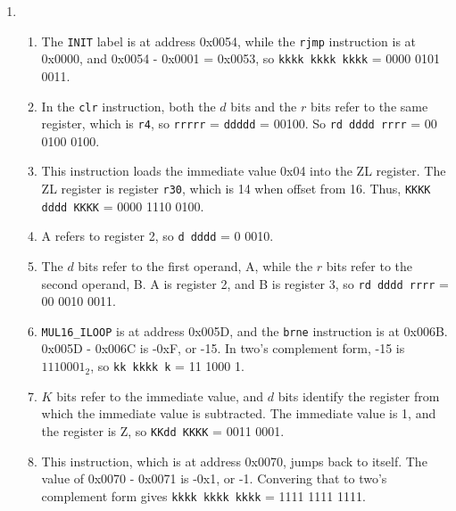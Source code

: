 \documentclass[11pt]{article}
\begin{document}
\begin{enumerate}[leftmargin=0.2in]
\item
  \begin{enumerate}
    \item The \texttt{INIT} label is at address 0x0054, while the \texttt{rjmp} instruction is at 0x0000, and 0x0054 - 0x0001 = 0x0053, so \texttt{kkkk kkkk kkkk} = 0000 0101 0011.
    \item In the \texttt{clr} instruction, both the $d$ bits and the $r$ bits refer to the same register, which is \texttt{r4}, so \texttt{rrrrr} = \texttt{ddddd} = 00100. So \texttt{rd dddd rrrr} = 00 0100 0100.
    \item This instruction loads the immediate value 0x04 into the ZL register. The ZL register is register \texttt{r30}, which is 14 when offset from 16. Thus, \texttt{KKKK dddd KKKK} = 0000 1110 0100.
    \item A refers to register 2, so \texttt{d dddd} = 0 0010.
    \item The $d$ bits refer to the first operand, A, while the $r$ bits refer to the second operand, B. A is register 2, and B is register 3, so \texttt{rd dddd rrrr} = 00 0010 0011.
    \item \texttt{MUL16\_ILOOP} is at address 0x005D, and the \texttt{brne} instruction is at 0x006B. 0x005D - 0x006C is -0xF, or -15. In two's complement form, -15 is $1110001_2$, so \texttt{kk kkkk k} = 11 1000 1.
    \item $K$ bits refer to the immediate value, and $d$ bits identify the register from which the immediate value is subtracted. The immediate value is 1, and the register is Z, so \texttt{KKdd KKKK} = 0011 0001.
    \item This instruction, which is at address 0x0070, jumps back to itself. The value of 0x0070 - 0x0071 is -0x1, or -1. Convering that to two's complement form gives \texttt{kkkk kkkk kkkk} = 1111 1111 1111.
  \end{enumerate}

\end{enumerate}
\end{document}
